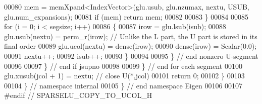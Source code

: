 \begin{DoxyCode}
00080           mem = memXpand<IndexVector>(glu.usub, glu.nzumax, nextu, USUB, glu.num\_expansions); 
00081           \textcolor{keywordflow}{if} (mem) \textcolor{keywordflow}{return} mem; 
00082           
00083         \}
00084         
00085         \textcolor{keywordflow}{for} (i = 0; i < segsize; i++)
00086         \{
00087           irow = glu.lsub(isub); 
00088           glu.usub(nextu) = perm\_r(irow); \textcolor{comment}{// Unlike the L part, the U part is stored in its final order}
00089           glu.ucol(nextu) = dense(irow); 
00090           dense(irow) = Scalar(0.0); 
00091           nextu++;
00092           isub++;
00093         \}
00094         
00095       \} \textcolor{comment}{// end nonzero U-segment }
00096       
00097     \} \textcolor{comment}{// end if jsupno }
00098     
00099   \} \textcolor{comment}{// end for each segment}
00100   glu.xusub(jcol + 1) = nextu; \textcolor{comment}{// close U(*,jcol)}
00101   \textcolor{keywordflow}{return} 0; 
00102 \}
00103 
00104 \} \textcolor{comment}{// namespace internal}
00105 \} \textcolor{comment}{// end namespace Eigen}
00106 
00107 \textcolor{preprocessor}{#endif // SPARSELU\_COPY\_TO\_UCOL\_H}
\end{DoxyCode}
